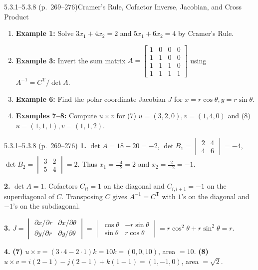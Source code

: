 \documentclass[11pt,a4paper,openany,oneside]{book}
\def\vect#1{#1}%
\def\mathbf#1{#1}%
\def\boldsymbol#1{#1}%
\newcommand{\vect}[1]{\mathbf{#1}}
\newcommand{\ihat}{\boldsymbol{i}}
\newcommand{\jhat}{\boldsymbol{j}}
\newcommand{\khat}{\boldsymbol{k}}
\newcommand{\T}{\mathrm{T}}
\numberwithin{equation}{chapter}
\begin{document}
\begin{example}{5.3.1--5.3.8 (p.\ 269--276)}{Cramer's Rule, Cofactor Inverse, Jacobian, and Cross Product}
\begin{enumerate}
\item \textbf{Example 1:} Solve $3x_1 + 4x_2 = 2$ and $5x_1 + 6x_2 = 4$ by Cramer's Rule.
\item \textbf{Example 3:} Invert the sum matrix $A = \begin{bmatrix}1&0&0&0\\1&1&0&0\\1&1&1&0\\1&1&1&1\end{bmatrix}$ using $A^{-1} = C^\T / \det A$.
\item \textbf{Example 6:} Find the polar coordinate Jacobian $J$ for $x = r\cos\theta, y = r\sin\theta$.
\item \textbf{Examples 7--8:} Compute $\vect{u}\times\vect{v}$ for (7) $\vect{u}=(3,2,0), \vect{v}=(1,4,0)$ and (8) $\vect{u}=(1,1,1), \vect{v}=(1,1,2)$.
\end{enumerate}
\end{example}

\vfill
\begin{pageend_sol}{5.3.1--5.3.8 (p.\ 269--276)}
\textbf{1.} $\det A = 18-20 = -2$, $\det B_1 = \begin{vmatrix}2&4\\4&6\end{vmatrix} = -4$, $\det B_2 = \begin{vmatrix}3&2\\5&4\end{vmatrix} = 2$. Thus $x_1 = \frac{-4}{-2} = 2$ and $x_2 = \frac{2}{-2} = -1$.

\textbf{2.} $\det A = 1$. Cofactors $C_{ii} = 1$ on the diagonal and $C_{i,i+1} = -1$ on the superdiagonal of $C$. Transposing $C$ gives $A^{-1} = C^\T$ with $1$'s on the diagonal and $-1$'s on the subdiagonal.

\textbf{3.} $J = \begin{vmatrix}\partial x/\partial r & \partial x/\partial\theta\\\partial y/\partial r & \partial y/\partial\theta\end{vmatrix} = \begin{vmatrix}\cos\theta & -r\sin\theta\\\sin\theta & r\cos\theta\end{vmatrix} = r\cos^2\theta + r\sin^2\theta = r$.

\textbf{4.} \textbf{(7)} $\vect{u}\times\vect{v} = (3\cdot 4 - 2\cdot 1)\khat = 10\khat = (0,0,10)$, area $= 10$. \textbf{(8)} $\vect{u}\times\vect{v} = \ihat(2-1) - \jhat(2-1) + \khat(1-1) = (1,-1,0)$, area $= \sqrt{2}$.
\end{pageend_sol}
\clearpage
\end{document}
